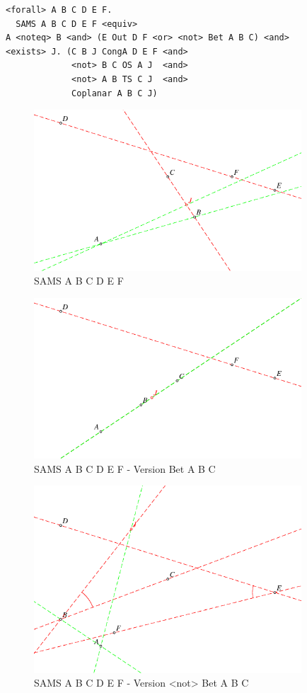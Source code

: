 \documentclass[8pt,a4paper]{article}
\theoremstyle{plain}
\begin{document}
\begin{tcolorbox}
\begin{verbatim}
<forall> A B C D E F.
  SAMS A B C D E F <equiv>
A <noteq> B <and> (E Out D F <or> <not> Bet A B C) <and>
<exists> J. (C B J CongA D E F <and> 
             <not> B C OS A J  <and> 
             <not> A B TS C J  <and> 
             Coplanar A B C J)
\end{verbatim}
\end{tcolorbox}

    \begin{figure}[H] %
  \centering
    \includegraphics[width=100mm]{fig10.pdf}
\caption{SAMS A B C D E F\label{SAMS}}
\end{figure}

    
    \begin{figure}[H] %
  \centering
    \includegraphics[width=100mm]{fig11.pdf}
\caption{SAMS A B C D E F - Version Bet A B C\label{SAMS2}}
\end{figure}

        \begin{figure}[H] %
  \centering
    \includegraphics[width=100mm]{fig12.pdf}
\caption{SAMS A B C D E F - Version <not> Bet A B C\label{SAMS3}}
\end{figure}
\end{document}
